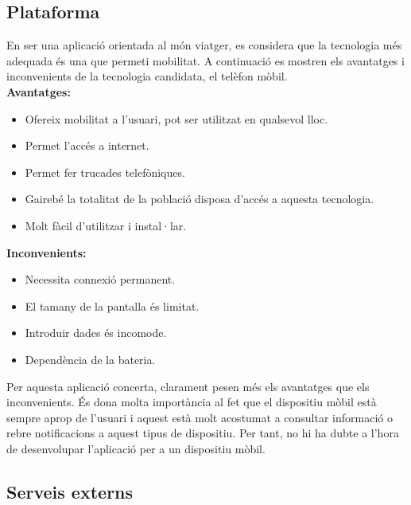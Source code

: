 \subsection{Plataforma}
En ser una aplicació orientada al món viatger, es considera que la tecnologia més adequada és una que permeti mobilitat. A continuació es mostren els avantatges i inconvenients de la tecnologia candidata, el telèfon mòbil.\\
\textbf{Avantatges:}
\begin{itemize}
\item{}Ofereix mobilitat a l’usuari, pot ser utilitzat en qualsevol lloc.
\item{}Permet l’accés a internet.
\item{}Permet fer trucades telefòniques.
\item{}Gairebé la totalitat de la població disposa d’accés a aquesta tecnologia.
\item{}Molt fàcil d’utilitzar i instal·lar.
\end{itemize}

\textbf{Inconvenients:}
\begin{itemize}
\item{}Necessita connexió permanent.
\item{}El tamany de la pantalla és limitat.
\item{}Introduir dades és incomode.
\item{}Dependència de la bateria.
\end{itemize}

Per aquesta aplicació concerta, clarament pesen més els avantatges que els
inconvenients. És dona molta importància al fet que el dispositiu mòbil
està sempre aprop de l’usuari i aquest està molt acostumat a consultar
informació o rebre notificacions a aquest tipus de dispositiu. Per tant, no
hi ha dubte a l’hora de desenvolupar l’aplicació per a un dispositiu mòbil.

\subsection{Serveis externs}

